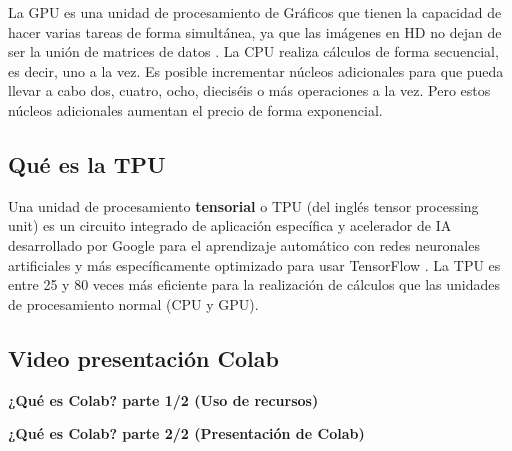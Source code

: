 \documentclass[
]{book}
\begin{document}
La GPU es una unidad de procesamiento de Gráficos que tienen la capacidad de hacer varias tareas de forma simultánea, ya que las imágenes en HD no dejan de ser la unión de matrices de datos \citep{DescripcionGPU}. La CPU realiza cálculos de forma secuencial, es decir, uno a la vez. Es posible incrementar núcleos adicionales para que pueda llevar a cabo dos, cuatro, ocho, dieciséis o más operaciones a la vez. Pero estos núcleos adicionales aumentan el precio de forma exponencial.

\hypertarget{quuxe9-es-la-tpu}{%
\subsection{Qué es la TPU}\label{quuxe9-es-la-tpu}}

Una unidad de procesamiento \textbf{tensorial} o TPU (del inglés tensor processing unit) es un circuito integrado de aplicación específica y acelerador de IA desarrollado por Google para el aprendizaje automático con redes neuronales artificiales y más específicamente optimizado para usar TensorFlow \citep{DescripcionTPU}. La TPU es entre 25 y 80 veces más eficiente para la realización de cálculos que las unidades de procesamiento normal (CPU y GPU).

\hypertarget{video-presentaciuxf3n-colab}{%
\subsection{Video presentación Colab}\label{video-presentaciuxf3n-colab}}

\textbf{¿Qué es Colab? parte 1/2 (Uso de recursos)}

\textbf{¿Qué es Colab? parte 2/2 (Presentación de Colab)}

  
\end{document}
